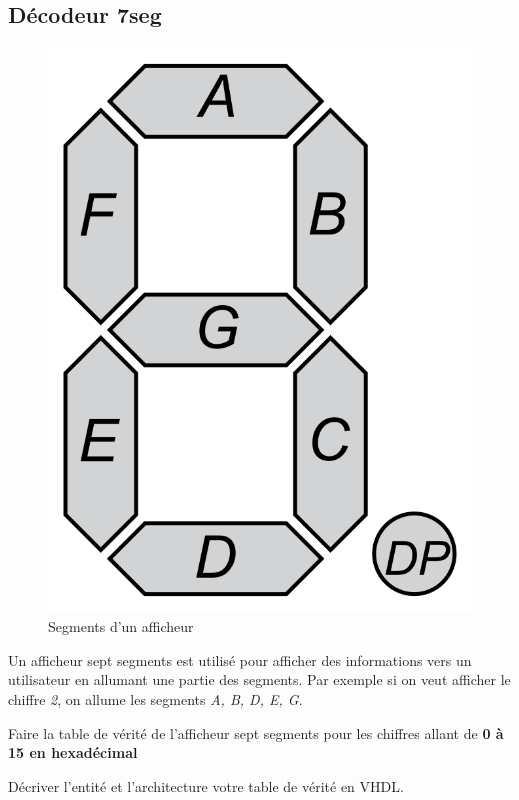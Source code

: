 \subsection{Décodeur 7seg}
\begin{figure}[ht]
    \centering
    \includegraphics[scale = 0.1]{img/SevenSegDisplay.png}
    \caption{Segments d'un afficheur}
\end{figure}

Un afficheur sept segments est utilisé pour afficher des informations vers un utilisateur en allumant une partie des segments. Par exemple si on veut afficher le chiffre \textit{2}, on allume les segments \textit{A, B, D, E, G}.

\medskip

Faire la table de vérité de l'afficheur sept segments pour les chiffres allant de \textbf{0 à 15 en hexadécimal}

\medskip

Décriver l'entité et l'architecture votre table de vérité en VHDL.

